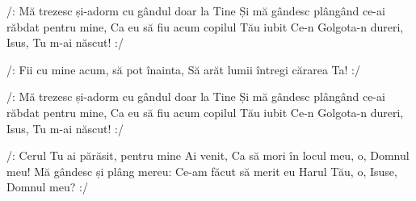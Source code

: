 \beginverse
/: Mă trezesc și-adorm cu gândul doar la Tine
Și mă gândesc plângând ce-ai răbdat pentru mine,
Ca eu să fiu acum copilul Tău iubit
Ce-n Golgota-n dureri, Isus, Tu m-ai născut! :/
\endverse

\beginchorus
/: Fii cu mine acum, să pot înainta,
Să arăt lumii întregi cărarea Ta! :/
\endchorus

\beginverse
/: Mă trezesc și-adorm cu gândul doar la Tine
Și mă gândesc plângând ce-ai răbdat pentru mine,
Ca eu să fiu acum copilul Tău iubit
Ce-n Golgota-n dureri, Isus, Tu m-ai născut! :/
\endverse

\beginverse*
/: Cerul Tu ai părăsit, pentru mine Ai venit,
Ca să mori în locul meu, o, Domnul meu!
Mă gândesc și plâng mereu:
Ce-am făcut să merit eu
Harul Tău, o, Isuse, Domnul meu? :/
\endverse
\endsong